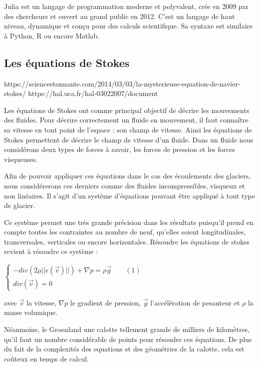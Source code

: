\documentclass{article}
\begin{document}
Julia est un langage de programmation moderne et polyvalent, crée en 2009 par des chercheurs et ouvert au grand public en 2012. C'est un langage de haut niveau, dynamique et conçu pour des calculs scientifique. Sa syntaxe est similaire à Python, R ou encore Matlab.
 


\subsection{Les équations de Stokes}

https://scienceetonnante.com/2014/03/03/la-mysterieuse-equation-de-navier-stokes/
https://hal.uca.fr/hal-03022007/document

Les équations de Stokes ont comme principal objectif de décrire les mouvements des fluides. 
Pour décrire correctement un fluide en mouvement, il faut connaître sa vitesse en tout point de l'espace : son champ de vitesse. Ainsi les équations de Stokes permettent de décrire le champ de vitesse d'un fluide. 
Dans un fluide nous considérons deux types de forces à savoir, les forces de pression et les forces visqueuses. 

Afin de pouvoir appliquer ces équations dans le cas des écoulements des glaciers, nous considérerons ces derniers comme des fluides incompressibles, visqueux et non linéaires. Il s'agit d'un système d'équations pouvant être appliqué à tout type de glacier.

Ce système permet une très grande précision dans les résultats puisqu'il prend en compte toutes les contraintes au nombre de neuf, qu’elles soient longitudinales, transversales, verticales ou encore horizontales. 
Résoudre les équations de stokes revient à résoudre ce système : 


\begin{center}
$\left\{
\begin{array}{l}
-div(2 \mu ||\epsilon(\vec{v})||) + \nabla p = \rho \vec{g} \qquad(1)  \\
div(\vec{v}) = 0 \qquad
\end{array}
\right.$
\end{center}

avec $\vec{v}$ la vitesse, $\nabla p$ le gradient de pression, $\vec{g}$ l'accélération de pesanteur et $\rho$ la masse volumique.

Néanmoins, le Groenland  une calotte tellement grande de milliers de kilomètres, qu'il faut un nombre considérable de points pour résoudre ces équations. De plus du fait de la complexités des equations et des géométries de la calotte, cela est coûteux en temps de calcul. 
\end{document}
